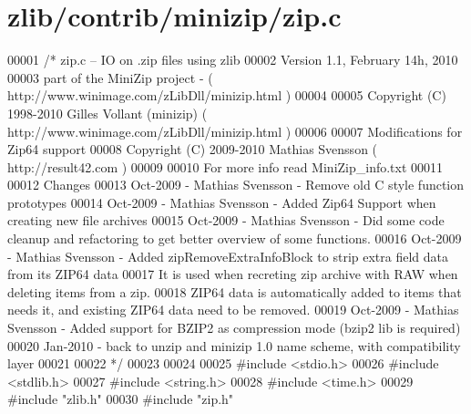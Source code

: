 \hypertarget{zlib_2contrib_2minizip_2zip_8c_source}{}\section{zlib/contrib/minizip/zip.c}
\label{zlib_2contrib_2minizip_2zip_8c_source}

\begin{DoxyCode}
00001 \textcolor{comment}{/* zip.c -- IO on .zip files using zlib}
00002 \textcolor{comment}{   Version 1.1, February 14h, 2010}
00003 \textcolor{comment}{   part of the MiniZip project - ( http://www.winimage.com/zLibDll/minizip.html )}
00004 \textcolor{comment}{}
00005 \textcolor{comment}{         Copyright (C) 1998-2010 Gilles Vollant (minizip) ( http://www.winimage.com/zLibDll/minizip.html )}
00006 \textcolor{comment}{}
00007 \textcolor{comment}{         Modifications for Zip64 support}
00008 \textcolor{comment}{         Copyright (C) 2009-2010 Mathias Svensson ( http://result42.com )}
00009 \textcolor{comment}{}
00010 \textcolor{comment}{         For more info read MiniZip\_info.txt}
00011 \textcolor{comment}{}
00012 \textcolor{comment}{         Changes}
00013 \textcolor{comment}{   Oct-2009 - Mathias Svensson - Remove old C style function prototypes}
00014 \textcolor{comment}{   Oct-2009 - Mathias Svensson - Added Zip64 Support when creating new file archives}
00015 \textcolor{comment}{   Oct-2009 - Mathias Svensson - Did some code cleanup and refactoring to get better overview of some
       functions.}
00016 \textcolor{comment}{   Oct-2009 - Mathias Svensson - Added zipRemoveExtraInfoBlock to strip extra field data from its ZIP64
       data}
00017 \textcolor{comment}{                                 It is used when recreting zip archive with RAW when deleting items from a
       zip.}
00018 \textcolor{comment}{                                 ZIP64 data is automatically added to items that needs it, and existing
       ZIP64 data need to be removed.}
00019 \textcolor{comment}{   Oct-2009 - Mathias Svensson - Added support for BZIP2 as compression mode (bzip2 lib is required)}
00020 \textcolor{comment}{   Jan-2010 - back to unzip and minizip 1.0 name scheme, with compatibility layer}
00021 \textcolor{comment}{}
00022 \textcolor{comment}{*/}
00023 
00024 
00025 \textcolor{preprocessor}{#include <stdio.h>}
00026 \textcolor{preprocessor}{#include <stdlib.h>}
00027 \textcolor{preprocessor}{#include <string.h>}
00028 \textcolor{preprocessor}{#include <time.h>}
00029 \textcolor{preprocessor}{#include "zlib.h"}
00030 \textcolor{preprocessor}{#include "zip.h"}

\end{DoxyCode}

